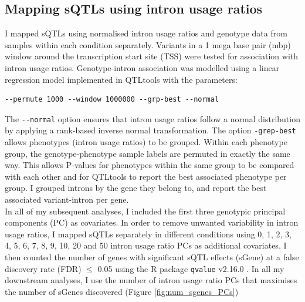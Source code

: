 \subsection{Mapping sQTLs using intron usage ratios}
I mapped sQTLs using normalised intron usage ratios and genotype data from samples within each condition separately. Variants in a 1 mega base pair (mbp) window around the transcription start site (TSS) were tested for association with intron usage ratios. Genotype-intron association was modelled using a linear regression model implemented in QTLtools \cite{Delaneau2017-dg} with the parameters:
\begin{verbatim}
--permute 1000 --window 1000000 --grp-best --normal
\end{verbatim}
The \Verb+--normal+ option ensures that intron usage ratios follow a normal distribution by applying a rank-based inverse normal transformation. The option \Verb+-grep-best+ allows phenotypes (intron usage ratios) to be grouped. Within each phenotype group, the genotype-phenotype sample labels are permuted in exactly the same way. This allows P-values for phenotypes within the same group to be compared with each other and for QTLtools to report the best associated phenotype per group. I grouped introns by the gene they belong to, and report the best associated variant-intron per gene. \\

In all of my subsequent analyses, I included the first three genotypic principal components (PC) as covariates. In order to remove unwanted variability in intron usage ratios, I mapped sQTLs separately in different conditions using 0, 1, 2, 3, 4, 5, 6, 7, 8, 9, 10, 20 and 50  intron usage ratio PCs as additional covariates. I then counted the number of genes with significant sQTL effects (sGene) at a false discovery rate (FDR) $\leq$ 0.05 using the R package \Verb+qvalue+ v2.16.0 \cite{Storey2003-zd}. In all my downstream analyses, I use the number of intron usage ratio PCs that maximises the number of sGenes discovered (Figure \ref{fig:num_sgenes_PCs})

